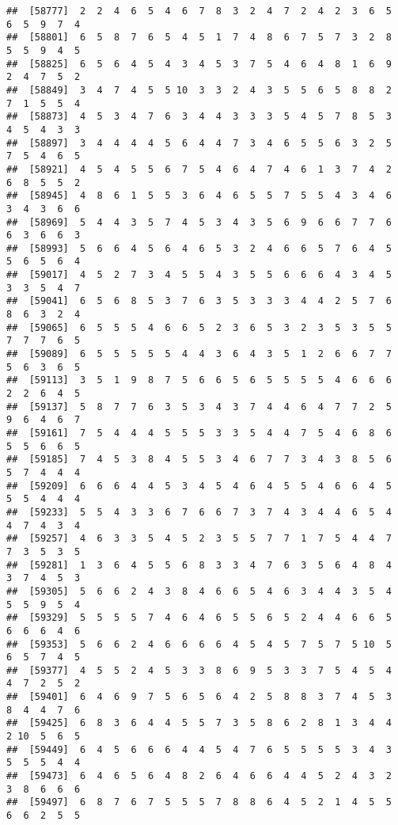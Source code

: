 \documentclass[
]{book}
\begin{document}
\begin{verbatim}
##  [58777]  2  2  4  6  5  4  6  7  8  3  2  4  7  2  4  2  3  6  5  6  5  9  7  4
##  [58801]  6  5  8  7  6  5  4  5  1  7  4  8  6  7  5  7  3  2  8  5  5  9  4  5
##  [58825]  6  5  6  4  5  4  3  4  5  3  7  5  4  6  4  8  1  6  9  2  4  7  5  2
##  [58849]  3  4  7  4  5  5 10  3  3  2  4  3  5  5  6  5  8  8  2  7  1  5  5  4
##  [58873]  4  5  3  4  7  6  3  4  4  3  3  3  5  4  5  7  8  5  3  4  5  4  3  3
##  [58897]  3  4  4  4  4  5  6  4  4  7  3  4  6  5  5  6  3  2  5  7  5  4  6  5
##  [58921]  4  5  4  5  5  6  7  5  4  6  4  7  4  6  1  3  7  4  2  6  8  5  5  2
##  [58945]  4  8  6  1  5  5  3  6  4  6  5  5  7  5  5  4  3  4  6  3  4  3  6  6
##  [58969]  5  4  4  3  5  7  4  5  3  4  3  5  6  9  6  6  7  7  6  6  3  6  6  3
##  [58993]  5  6  6  4  5  6  4  6  5  3  2  4  6  6  5  7  6  4  5  5  6  5  6  4
##  [59017]  4  5  2  7  3  4  5  5  4  3  5  5  6  6  6  4  3  4  5  3  3  5  4  7
##  [59041]  6  5  6  8  5  3  7  6  3  5  3  3  3  4  4  2  5  7  6  8  6  3  2  4
##  [59065]  6  5  5  5  4  6  6  5  2  3  6  5  3  2  3  5  3  5  5  7  7  7  6  5
##  [59089]  6  5  5  5  5  5  4  4  3  6  4  3  5  1  2  6  6  7  7  5  6  3  6  5
##  [59113]  3  5  1  9  8  7  5  6  6  5  6  5  5  5  5  4  6  6  6  2  2  6  4  5
##  [59137]  5  8  7  7  6  3  5  3  4  3  7  4  4  6  4  7  7  2  5  9  6  4  6  7
##  [59161]  7  5  4  4  4  5  5  5  3  3  5  4  4  7  5  4  6  8  6  5  5  6  6  5
##  [59185]  7  4  5  3  8  4  5  5  3  4  6  7  7  3  4  3  8  5  6  5  7  4  4  4
##  [59209]  6  6  6  4  4  5  3  4  5  4  6  4  5  5  4  6  6  4  5  5  5  4  4  4
##  [59233]  5  5  4  3  3  6  7  6  6  7  3  7  4  3  4  4  6  5  4  4  7  4  3  4
##  [59257]  4  6  3  3  5  4  5  2  3  5  5  7  7  1  7  5  4  4  7  7  3  5  3  5
##  [59281]  1  3  6  4  5  5  6  8  3  3  4  7  6  3  5  6  4  8  4  3  7  4  5  3
##  [59305]  5  6  6  2  4  3  8  4  6  6  5  4  6  3  4  4  3  5  4  5  5  9  5  4
##  [59329]  5  5  5  5  7  4  6  4  6  5  5  6  5  2  4  4  6  6  5  6  6  6  4  6
##  [59353]  5  6  6  2  4  6  6  6  6  4  5  4  5  7  5  7  5 10  5  6  5  7  4  5
##  [59377]  4  5  5  2  4  5  3  3  8  6  9  5  3  3  7  5  4  5  4  4  7  2  5  2
##  [59401]  6  4  6  9  7  5  6  5  6  4  2  5  8  8  3  7  4  5  3  8  4  4  7  6
##  [59425]  6  8  3  6  4  4  5  5  7  3  5  8  6  2  8  1  3  4  4  2 10  5  6  5
##  [59449]  6  4  5  6  6  6  4  4  5  4  7  6  5  5  5  5  3  4  3  5  5  5  4  4
##  [59473]  6  4  6  5  6  4  8  2  6  4  6  6  4  4  5  2  4  3  2  3  8  6  6  6
##  [59497]  6  8  7  6  7  5  5  5  7  8  8  6  4  5  2  1  4  5  5  6  6  2  5  5

\end{verbatim}
\end{document}
